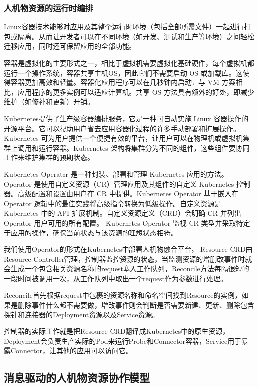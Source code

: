 \documentclass[12pt,a4paper]{article}
\begin{document}
\subsubsection{人机物资源的运行时编排}

Linux容器技术能够对应用及其整个运行时环境（包括全部所需文件）一起进行打包或隔离。从而让开发者可以在不同环境（如开发、测试和生产等环境）之间轻松迁移应用，同时还可保留应用的全部功能。

容器是虚拟化的主要形式之一，相比于虚拟机需要虚拟化基础硬件，每个虚拟机都运行一个操作系统，容器共享主机OS，因此它们不需要启动 OS 或加载库。这使得容器更加高效和轻量。容器化应用程序可以在几秒钟内启动，与 VM 方案相比，应用程序的更多实例可以适应计算机。共享 OS 方法具有额外的好处，即减少维护（如修补和更新）开销。

Kubernetes提供了生产级容器编排服务，它是一种可自动实施 Linux 容器操作的开源平台。它可以帮助用户省去应用容器化过程的许多手动部署和扩展操作。Kubernetes 可为用户提供一个便捷有效的平台，让用户可以在物理机或虚拟机集群上调用和运行容器。Kubernetes 架构将集群分为不同的组件，这些组件要协同工作来维护集群的预期状态。

Kubernetes Operator 是一种封装、部署和管理 Kubernetes 应用的方法。Operator 是使用自定义资源（CR）管理应用及其组件的自定义 Kubernetes 控制器。高级配置和设置由用户在 CR 中提供。Kubernetes Operator 基于嵌入在 Operator 逻辑中的最佳实践将高级指令转换为低级操作。自定义资源是 Kubernetes 中的 API 扩展机制。自定义资源定义（CRD）会明确 CR 并列出 Operator 用户可用的所有配置。 Kubernetes Operator 监视 CR 类型并采取特定于应用的操作，确保当前状态与该资源的理想状态相符。

我们使用Operator的形式在Kubernetes中部署人机物融合平台。
Resource CRD由Resource Controller管理，控制器监控资源的状态，当监测资源的增删改事件时就会生成一个包含相关资源名称的request塞入工作队列，Reconcile方法每隔很短的一段时间被调用一次，从工作队列中取出一个request作为参数进行处理。

Reconcile首先根据request中包裹的资源名称和命名空间找到Resource的实例，如果是删除事件什么都不需要做，增改事件则会判断是否需要新建、更新、删除包含探针和连接器的Deployment资源以及Service资源。

控制器的实际工作就是把Resource CRD翻译成Kubernetes中的原生资源，Deployment会负责生产实际的Pod来运行Probe和Connector容器，Service用于暴露Connector，让其他的应用可以访问它。

\subsection{消息驱动的人机物资源协作模型}
\end{document}
